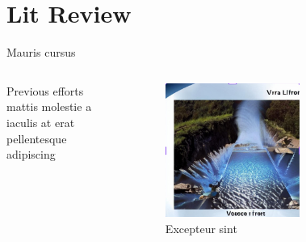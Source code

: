 
\section{Lit Review}


\begin{frame}{Mauris cursus}
    \begin{columns}
    Previous efforts mattis molestie a iaculis at erat pellentesque adipiscing\cite{rachen_conspiratorial_2013, armstrong_neural_2017}
        \begin{figure}
            \centering
            \includegraphics[width=0.75\linewidth]{images/image2.png}
            \caption{Excepteur sint\cite{leembruggen_whats_2022}}
            \label{fig:excepteur_sint}
        \end{figure}
    \begin{figure}
        \centering

\end{figure}
\end{columns}
\end{frame}
